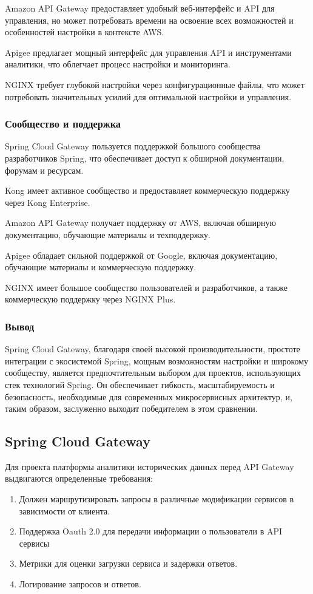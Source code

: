 Amazon API Gateway предоставляет удобный веб-интерфейс и API для управления, но может потребовать времени на освоение
всех возможностей и особенностей настройки в контексте AWS\@.

Apigee предлагает мощный интерфейс для управления API и инструментами аналитики, что облегчает процесс настройки и
мониторинга.

NGINX требует глубокой настройки через конфигурационные файлы, что может потребовать значительных усилий для оптимальной
настройки и управления.

\subsubsection{Сообщество и поддержка}

Spring Cloud Gateway пользуется поддержкой большого сообщества разработчиков Spring, что обеспечивает доступ к обширной
документации, форумам и ресурсам.

Kong имеет активное сообщество и предоставляет коммерческую поддержку через Kong Enterprise.

Amazon API Gateway получает поддержку от AWS, включая обширную документацию, обучающие материалы и техподдержку.

Apigee обладает сильной поддержкой от Google, включая документацию, обучающие материалы и коммерческую поддержку.

NGINX имеет большое сообщество пользователей и разработчиков, а также коммерческую поддержку через NGINX Plus.

\subsubsection{Вывод}

Spring Cloud Gateway, благодаря своей высокой производительности, простоте интеграции с экосистемой Spring, мощным
возможностям настройки и широкому сообществу, является предпочтительным выбором для проектов, использующих стек
технологий Spring.
Он обеспечивает гибкость, масштабируемость и безопасность, необходимые для современных микросервисных
архитектур, и, таким образом, заслуженно выходит победителем в этом сравнении.

\subsection{Spring Cloud Gateway}

Для проекта платформы аналитики исторических данных перед API Gateway выдвигаются определенные
требования:
\begin{enumerate}
    \item  Должен маршрутизировать запросы в различные модификации сервисов в зависимости от клиента.
    \item Поддержка Oauth 2.0 для передачи информации о пользователи в API сервисы
    \item Метрики для оценки загрузки сервиса и задержки ответов.
    \item Логирование запросов и ответов.
\end{enumerate}



